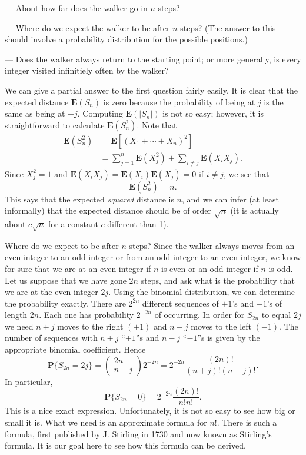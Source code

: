 \documentclass{stml-l}
\theoremstyle{definition}
\numberwithin{equation}{chapter}
\numberwithin{figure}{chapter}
\numberwithin{figure}{section}
\begin{document}
--- About how far does the walker go in $n$ steps?

--- Where do we expect the walker to be after $n$ steps? (The answer to this should involve a probability distribution for the possible positions.)

--- Does the walker always return to the starting point; or more generally, is every integer visited infinitiely often by the walker?

We can give a partial answer to the first question fairly easily. It
is clear that the expected distance $\mathbf{E}(S_{n})$ is zero
because the probability of being at $j$ is the same as being at
$-j$. Computing $\mathbf{E}(|S_{n}|)$ is not so easy; however, it is
straightforward to calculate $\mathbf{E}(S_{n}^{2})$. Note that
\begin{align*}
\mathbf{E}(S_{n}^{2})&=\mathbf{E}[(X_{1}+\cdots+X_{n})^{2}]\\
&=\sum\limits_{j=1}^{n}\mathbf{E}(X_{j}^{2})+\sum\limits_{i\neq
j}\mathbf{E}(X_{i}X_{j}).
\end{align*}
Since $X_{j}^{2}=1$ and
$\mathbf{E}(X_{i}X_{j})=\mathbf{E}(X_{i})\mathbf{E}(X_{j})=0$ if
$i\neq j$, we see that
\begin{equation*}
\mathbf{E}(S_{n}^{2})=n.
\end{equation*}
This says that the expected \emph{squared} distance is $n$, and we
can infer (at least informally) that the expected distance should be
of order $\sqrt{n}$ (it is actually about $c\sqrt{n}$ for a constant
$c$ different than 1).

Where do we expect to be after $n$ steps? Since the walker always
moves from an even integer to an odd integer or from an odd integer
to an even integer, we know for sure that we are at an even integer
if $n$ is even or an odd integer if $n$ is odd. Let us suppose that
we have gone $2n$ steps, and ask what is the probability that we are
at the even integer $2j$. Using the binomial distribution, we can
determine the probability exactly. There are $2^{2n}$ different
sequences of $+1$'s and $-1$'s of length $2n$. Each one has
probability $2^{-2n}$ of occurring. In order for $S_{2n}$ to equal
$2j$ we need $n+j$ moves to the right $(+1)$ and $n-j$ moves to the
left $(-1)$. The number of sequences with $n+j$ ``$+1$''s and $n-j$
``$-1$''s is given by the appropriate binomial coefficient. Hence
\begin{equation*}
\mathbf{P}\{S_{2n}=2j\}=\left(\begin{matrix}
2n\\
n+j
\end{matrix}\right) 2^{-2n}=2^{-2n}\frac{(2n)!}{(n+j)!(n-j)!}.
\end{equation*}
In particular,
\begin{equation*}
\mathbf{P}\{S_{2n}=0\}=2^{-2n}\frac{(2n)!}{n!n!}.
\end{equation*}
This is a nice exact expression. Unfortunately, it is not so easy to see how big or small it is. What we need is an approximate formula for $n!$. There is such a formula, first published by J. Stirling in 1730 and now known as Stirling's formula. It is our goal here to see how this formula can be derived.
\end{document}
